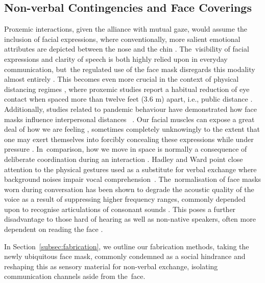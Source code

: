 {\subsection*{Non-verbal Contingencies and Face Coverings}
\label{subsev:face_coverings}

Proxemic interactions, given the alliance with mutual gaze, would assume the inclusion of facial expressions, where conventionally, more salient emotional attributes are depicted between the nose and the chin \citep{fischer_veiled_2012,blais_eyes_2012}. The~visibility of facial expressions and clarity of speech is both highly relied upon in everyday communication, but~the regulated use of the face mask disregards this modality almost entirely \citep{carbon_wearing_2020}. This becomes even more crucial in the context of physical distancing regimes \citep{campagne_problem_2021}, where proxemic studies report a habitual reduction of eye contact when spaced more than twelve feet (3.6 m) apart, i.e.,
public distance \citep{baldassare_cultural_1975}. Additionally, studies related to pandemic behaviour have demonstrated how face masks influence interpersonal distances %
~\cite{cartaud_wearing_2020}.
Our facial muscles can expose a great deal of how we are feeling \citep{qian_effects_2018,todorov_face_2017}, sometimes completely unknowingly to the extent that one may exert themselves into forcibly concealing these expressions while under pressure \citep{billings_challenge_2002}. In~comparison, how we move in space is normally a consequence of deliberate coordination during an interaction \citep{poyatos_interactive_1980,jones_communication_2016}. Hadley and Ward \cite{hadley_synchrony_2021} point close attention to the physical gestures used as a substitute for verbal exchange where background noises impair vocal comprehension~\cite{hadley_synchrony_2021}. The~normalisation of face masks worn during conversation has been shown to degrade the acoustic quality of the voice as a result of suppressing higher frequency ranges, commonly depended upon to recognise articulations of consonant sounds \citep{saunders_impacts_2021,rahne_influence_2021,nobrega_how_2020}. This poses a further disadvantage to those hard of hearing \citep{mckee_overcoming_2020} as well as non-native speakers, often more dependent on reading the face \citep{inceoglu_language_2021,jabber_non-verbal_2020}.

In Section~\ref{subsec:fabrication}, we outline our fabrication methods, taking the newly ubiquitous face mask, commonly condemned as a social hindrance and reshaping this as sensory material for non-verbal exchange, isolating communication channels aside from the~face.

}
